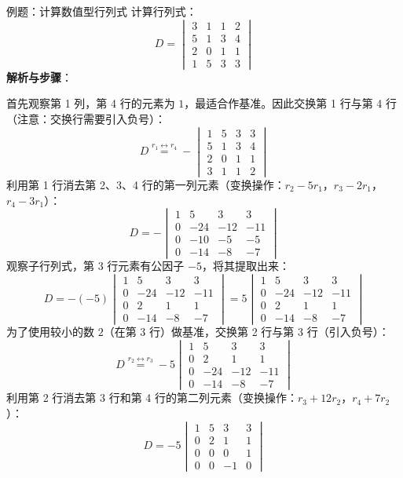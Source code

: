 \documentclass{ctexart}
\begin{document}
\begin{examplebox}{例题：计算数值型行列式}
  计算行列式：
  \[
  D = \begin{vmatrix} 3 & 1 & 1 & 2 \\ 5 & 1 & 3 & 4 \\ 2 & 0 & 1 & 1 \\ 1 & 5 & 3 & 3 \end{vmatrix}
  \]
  \textbf{解析与步骤}：
  
  首先观察第 1 列，第 4 行的元素为 $1$，最适合作基准。因此交换第 1 行与第 4 行（注意：交换行需要引入负号）：
  \[
  D \overset{r_1 \leftrightarrow r_4}{=} - \begin{vmatrix} 1 & 5 & 3 & 3 \\ 5 & 1 & 3 & 4 \\ 2 & 0 & 1 & 1 \\ 3 & 1 & 1 & 2 \end{vmatrix}
  \]
  利用第 1 行消去第 2、3、4 行的第一列元素（变换操作：$r_2 - 5r_1$，$r_3 - 2r_1$，$r_4 - 3r_1$）：
  \[
  D = - \begin{vmatrix} 1 & 5 & 3 & 3 \\ 0 & -24 & -12 & -11 \\ 0 & -10 & -5 & -5 \\ 0 & -14 & -8 & -7 \end{vmatrix}
  \]
  观察子行列式，第 3 行元素有公因子 $-5$，将其提取出来：
  \[
  D = - (-5) \begin{vmatrix} 1 & 5 & 3 & 3 \\ 0 & -24 & -12 & -11 \\ 0 & 2 & 1 & 1 \\ 0 & -14 & -8 & -7 \end{vmatrix} = 5 \begin{vmatrix} 1 & 5 & 3 & 3 \\ 0 & -24 & -12 & -11 \\ 0 & 2 & 1 & 1 \\ 0 & -14 & -8 & -7 \end{vmatrix}
  \]
  为了使用较小的数 $2$（在第 3 行）做基准，交换第 2 行与第 3 行（引入负号）：
  \[
  D \overset{r_2 \leftrightarrow r_3}{=} -5 \begin{vmatrix} 1 & 5 & 3 & 3 \\ 0 & 2 & 1 & 1 \\ 0 & -24 & -12 & -11 \\ 0 & -14 & -8 & -7 \end{vmatrix}
  \]
  利用第 2 行消去第 3 行和第 4 行的第二列元素（变换操作：$r_3 + 12r_2$，$r_4 + 7r_2$）：
  \[
  D = -5 \begin{vmatrix} 1 & 5 & 3 & 3 \\ 0 & 2 & 1 & 1 \\ 0 & 0 & 0 & 1 \\ 0 & 0 & -1 & 0 \end{vmatrix}
\]
\end{examplebox}
\end{document}
